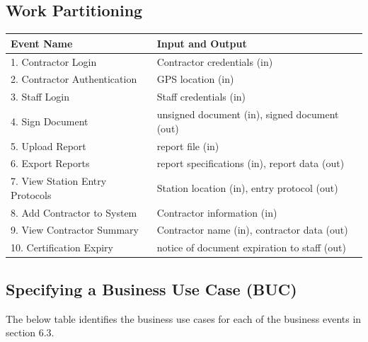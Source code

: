 \documentclass[12pt]{article}
\begin{document}
\subsection{Work Partitioning}
\begin{tabular}{|l|l|}
\hline
\textbf{Event Name} & \textbf{Input and Output} \\
\hline
1. Contractor Login & Contractor credentials (in) \\
\hline
2. Contractor Authentication & GPS location (in) \\
\hline
3. Staff Login & Staff credentials (in) \\
\hline
4. Sign Document & unsigned document (in), signed document (out) \\
\hline
5. Upload Report & report file (in) \\
\hline
6. Export Reports & report specifications (in), report data (out)\\
\hline
7. View Station Entry Protocols & Station location (in), entry protocol (out)\\
\hline
8. Add Contractor to System & Contractor information (in) \\
\hline
9. View Contractor Summary & Contractor name (in), contractor data (out) \\
\hline
10. Certification Expiry & notice of document expiration to staff (out) \\
\hline
\end{tabular}

\subsection{Specifying a Business Use Case (BUC)}
The below table identifies the business use cases for each of the
business events in section 6.3.\\
\end{document}
